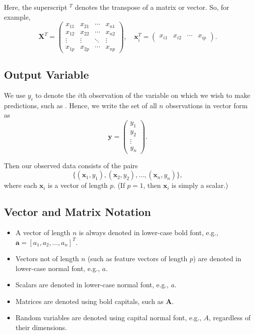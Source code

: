 Here, the superscript \( ^{T} \) denotes the transpose of a matrix or vector. So, for example, 
\[
\mathbf{X}^T = 
\begin{pmatrix}
x_{11} & x_{21} & \cdots & x_{n1} \\
x_{12} & x_{22} & \cdots & x_{n2} \\
\vdots & \vdots & \ddots & \vdots \\
x_{1p} & x_{2p} & \cdots & x_{np}
\end{pmatrix},
\quad
\mathbf{x}_i^T = 
\begin{pmatrix}
x_{i1} & x_{i2} & \cdots & x_{ip}
\end{pmatrix}.
\]

\subsection{Output Variable}

We use \( y_i \) to denote the \( i \)th observation of the variable on which we wish to make predictions, such as . Hence, we write the set of all \( n \) observations in vector form as
\[
\mathbf{y} = 
\begin{pmatrix}
y_1 \\
y_2 \\
\vdots \\
y_n
\end{pmatrix}.
\]

Then our observed data consists of the pairs 
\[
\{ (\mathbf{x}_1, y_1), (\mathbf{x}_2, y_2), \ldots, (\mathbf{x}_n, y_n) \},
\]
where each \( \mathbf{x}_i \) is a vector of length \( p \). (If \( p = 1 \), then \( \mathbf{x}_i \) is simply a scalar.)

\subsection{Vector and Matrix Notation}

\begin{itemize}
    \item A vector of length \( n \) is always denoted in lower-case bold font, e.g., \( \mathbf{a} = [a_1, a_2, \ldots, a_n]^T \).
    \item Vectors not of length \( n \) (such as feature vectors of length \( p \)) are denoted in lower-case normal font, e.g., \( a \).
    \item Scalars are denoted in lower-case normal font, e.g., \( a \).
    \item Matrices are denoted using bold capitals, such as \( \mathbf{A} \).
    \item Random variables are denoted using capital normal font, e.g., \( A \), regardless of their dimensions.
\end{itemize}

